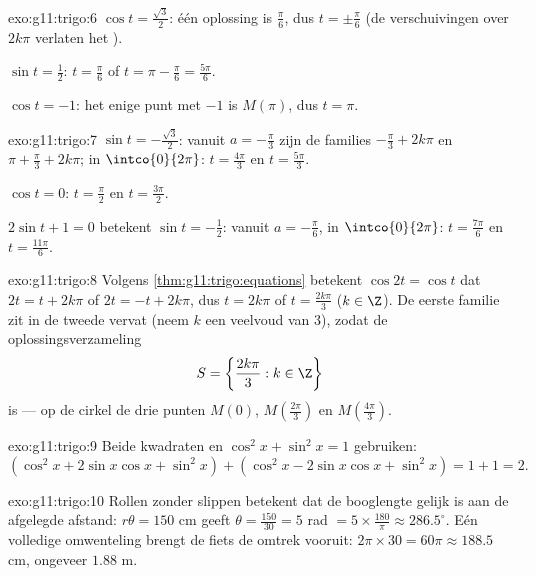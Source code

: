 \begin{solution}{exo:g11:trigo:6}
$\cos t = \frac{\sqrt3}{2}$: één oplossing is $\frac\pi6$, dus
$t = \pm\frac\pi6$ (de verschuivingen over $2k\pi$ verlaten het ).

$\sin t = \frac12$: $t = \frac\pi6$ of $t = \pi - \frac\pi6 =
\frac{5\pi}{6}$.

$\cos t = -1$: het enige punt met  $-1$ is $M(\pi)$, dus $t = \pi$.
\end{solution}

\begin{solution}{exo:g11:trigo:7}
$\sin t = -\frac{\sqrt3}{2}$: vanuit $a = -\frac\pi3$ zijn de families
$-\frac\pi3 + 2k\pi$ en $\pi + \frac\pi3 + 2k\pi$; in $\intco{0}{2\pi}$:
$t = \frac{4\pi}{3}$ en $t = \frac{5\pi}{3}$.

$\cos t = 0$: $t = \frac\pi2$ en $t = \frac{3\pi}{2}$.

$2\sin t + 1 = 0$ betekent $\sin t = -\frac12$: vanuit $a = -\frac\pi6$, in
$\intco{0}{2\pi}$: $t = \frac{7\pi}{6}$ en $t = \frac{11\pi}{6}$.
\end{solution}

\begin{solution}{exo:g11:trigo:8}
Volgens \cref{thm:g11:trigo:equations} betekent $\cos 2t = \cos t$ dat
$2t = t + 2k\pi$ of $2t = -t + 2k\pi$, dus $t = 2k\pi$ of
$t = \frac{2k\pi}{3}$ ($k \in \Z$). De eerste familie zit in de tweede
vervat (neem $k$ een veelvoud van $3$), zodat de oplossingsverzameling
\[
S = \left\{\frac{2k\pi}{3} : k \in \Z\right\}
\]
is --- op de cirkel de drie punten $M(0)$, $M\!\left(\frac{2\pi}{3}\right)$
en $M\!\left(\frac{4\pi}{3}\right)$.
\end{solution}

\begin{solution}{exo:g11:trigo:9}
Beide kwadraten  en $\cos^2 x + \sin^2 x = 1$ gebruiken:
\[
(\cos^2 x + 2\sin x\cos x + \sin^2 x)
+ (\cos^2 x - 2\sin x\cos x + \sin^2 x)
= 1 + 1 = 2 .
\]
\end{solution}

\begin{solution}{exo:g11:trigo:10}
Rollen zonder slippen betekent dat de booglengte gelijk is aan de afgelegde
afstand: $r\theta = 150$ cm geeft $\theta = \frac{150}{30} = 5$ rad
$= 5 \times \frac{180}{\pi} \approx 286.5^\circ$. Eén volledige omwenteling
brengt de fiets de omtrek vooruit: $2\pi \times 30 = 60\pi \approx 188.5$
cm, ongeveer $1.88$ m.
\end{solution}

